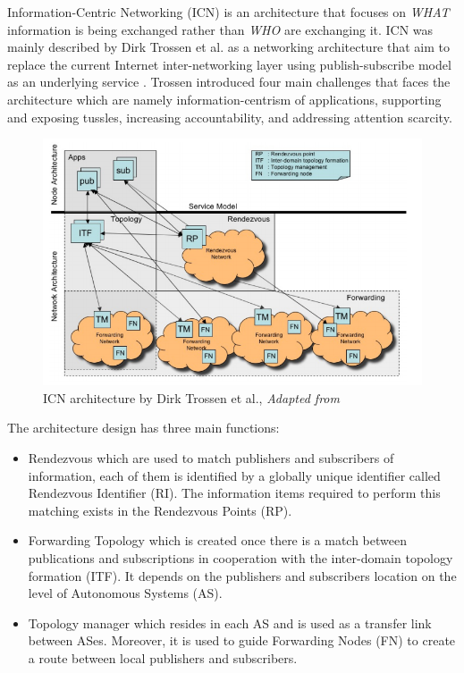 Information-Centric Networking (ICN) is an architecture that focuses on \textit{WHAT} information is being exchanged rather than \textit{WHO} are exchanging it. ICN was mainly described by Dirk Trossen et al. as a networking architecture that aim to replace the current Internet inter-networking layer using publish-subscribe model as an underlying service \cite{Trossen:2010:AII:1764873.1764878}. Trossen introduced four main challenges that faces the architecture which are namely information-centrism of applications, supporting and exposing tussles, increasing accountability, and addressing attention scarcity.
\begin{figure}[H]
	\centering
	\includegraphics[scale=0.4]{images/trossen.png}
	\caption{ICN architecture by Dirk Trossen et al., \textit{Adapted from } \cite{Trossen:2010:AII:1764873.1764878} }
	\label{fig:trossen}
\end{figure}

\noindent The architecture  design has three main functions:
\begin{itemize}
\item Rendezvous which are used to match  publishers and subscribers of information, each of them is identified by a globally unique identifier called Rendezvous Identifier (RI). The information items required to perform this matching exists in the Rendezvous Points (RP).
\item Forwarding Topology which is created once there is a match between publications and subscriptions in cooperation with the inter-domain topology formation (ITF). It depends on the publishers and subscribers location on the level of Autonomous Systems (AS).
\item Topology manager which resides in each AS and is used as a transfer link between ASes. Moreover, it is used to guide Forwarding Nodes (FN) to create a route between local publishers and subscribers.
\end{itemize}



